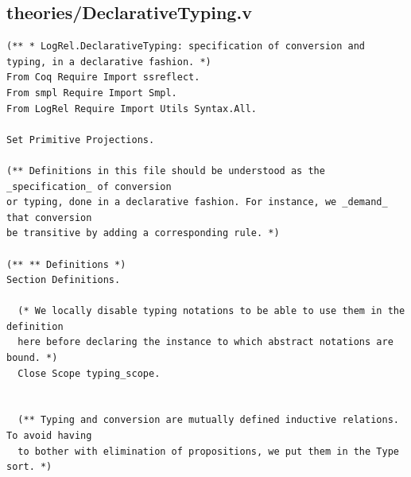 \documentclass[10pt,a4paper]{amsart}
\begin{document}
\subsection*{theories/DeclarativeTyping.v}
\begin{lstlisting}
(** * LogRel.DeclarativeTyping: specification of conversion and typing, in a declarative fashion. *)
From Coq Require Import ssreflect.
From smpl Require Import Smpl.
From LogRel Require Import Utils Syntax.All.

Set Primitive Projections.

(** Definitions in this file should be understood as the _specification_ of conversion
or typing, done in a declarative fashion. For instance, we _demand_ that conversion
be transitive by adding a corresponding rule. *)

(** ** Definitions *)
Section Definitions.

  (* We locally disable typing notations to be able to use them in the definition
  here before declaring the instance to which abstract notations are bound. *)
  Close Scope typing_scope.


  (** Typing and conversion are mutually defined inductive relations. To avoid having
  to bother with elimination of propositions, we put them in the Type sort. *)


\end{lstlisting}
\end{document}
